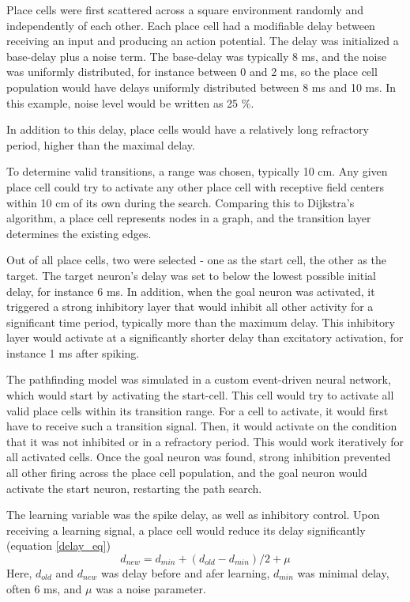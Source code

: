 \documentclass{article}
\begin{document}
    Place cells were first scattered across a square environment randomly and independently of each other. Each place cell had a modifiable delay between receiving an input and producing an action potential. The delay was initialized a base-delay plus a noise term. The base-delay was typically 8 ms, and the noise was uniformly distributed, for instance between 0 and 2 ms, so the place cell population would have delays uniformly distributed between 8 ms and 10 ms. In this example, noise level would be written as 25 \%.

    In addition to this delay, place cells would have a relatively long refractory period, higher than the maximal delay.

    To determine valid transitions, a range was chosen, typically 10 cm. Any given place cell could try to 
    activate any other place cell with receptive field centers within 10 cm of its own during the search. Comparing this to Dijkstra's algorithm, a place cell represents nodes in a graph, and the transition layer determines the existing edges.

    Out of all place cells, two were selected - one as the start cell, the other as the target. The target neuron's delay was set to below the lowest possible initial delay, for instance 6 ms. In addition, when the goal neuron was activated, it triggered a strong inhibitory layer that would inhibit all other activity for a significant time period, typically more than the maximum delay. This inhibitory layer would activate at a significantly shorter delay than excitatory activation, for instance 1 ms after spiking.

    The pathfinding model was simulated in a custom event-driven neural network, which would start by activating the start-cell. This cell would try to activate all valid place cells within its transition range. For a cell to activate, it would first have to receive such a transition signal. Then, it would activate on the condition that it was not inhibited or in a refractory period.
    This would work iteratively for all activated cells. Once the goal neuron was found, strong inhibition prevented all other firing across the place cell population, and the goal neuron would activate the start neuron, restarting the path search.

    The learning variable was the spike delay, as well as inhibitory control. Upon receiving a learning signal, a place cell would reduce its delay significantly (equation \ref{delay_eq})
        \begin{equation}\label{delay_eq} d_{new} = d_{min} + (d_{old}-d_{min})/2 + \mu \end{equation}
    Here, \(d_{old}\) and \(d_{new}\) was delay before and afer learning, \(d_{min}\) was minimal delay, often 6 ms, and \(\mu\) was a noise parameter.
\end{document}
